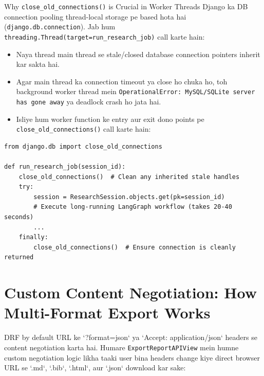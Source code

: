 \documentclass[11pt,a4paper,twoside]{report}
\begin{document}
\begin{dangerbox}{Why \texttt{close\_old\_connections()} is Crucial in Worker Threads}
Django ka DB connection pooling thread-local storage pe based hota hai (\texttt{django.db.connection}).
Jab hum \texttt{threading.Thread(target=run\_research\_job)} call karte hain:
\begin{itemize}
    \item Naya thread main thread se stale/closed database connection pointers inherit kar sakta hai.
    \item Agar main thread ka connection timeout ya close ho chuka ho, toh background worker thread mein \texttt{OperationalError: MySQL/SQLite server has gone away} ya deadlock crash ho jata hai.
    \item Isliye hum worker function ke entry aur exit dono points pe \texttt{close\_old\_connections()} call karte hain:
\end{itemize}

\begin{lstlisting}[style=pythonstyle]
from django.db import close_old_connections

def run_research_job(session_id):
    close_old_connections()  # Clean any inherited stale handles
    try:
        session = ResearchSession.objects.get(pk=session_id)
        # Execute long-running LangGraph workflow (takes 20-40 seconds)
        ...
    finally:
        close_old_connections()  # Ensure connection is cleanly returned
\end{lstlisting}
\end{dangerbox}

\section{Custom Content Negotiation: How Multi-Format Export Works}

DRF by default URL ke `?format=json` ya `Accept: application/json` headers se content negotiation karta hai.
Humare \texttt{ExportReportAPIView} mein humne custom negotiation logic likha taaki user bina headers change kiye direct browser URL se `.md`, `.bib`, `.html`, aur `.json` download kar sake:
\end{document}
